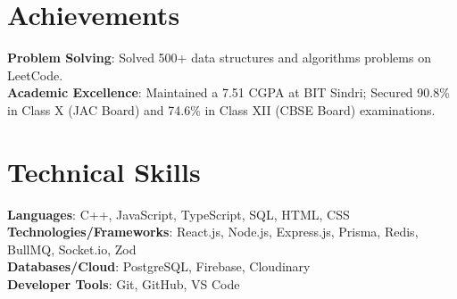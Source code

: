 \documentclass[letterpaper,11pt]{article}
\begin{document}
\section{Achievements}
 \begin{itemize}[leftmargin=0.15in, label={}]
    \small{\item{
     \textbf{Problem Solving}{: Solved 500+ data structures and algorithms problems on LeetCode.} \\
     \textbf{Academic Excellence}{: Maintained a 7.51 CGPA at BIT Sindri; Secured 90.8\% in Class X (JAC Board) and 74.6\% in Class XII (CBSE Board) examinations.}
    }}
 \end{itemize}
 \vspace{-16pt}

\section{Technical Skills}
 \begin{itemize}[leftmargin=0.15in, label={}]
    \small{\item{
     \textbf{Languages}{: C++, JavaScript, TypeScript, SQL, HTML, CSS} \\
     \textbf{Technologies/Frameworks}{: React.js, Node.js, Express.js, Prisma, Redis, BullMQ, Socket.io, Zod} \\
     \textbf{Databases/Cloud}{: PostgreSQL, Firebase, Cloudinary} \\
     \textbf{Developer Tools}{: Git, GitHub, VS Code} \\
    }}
 \end{itemize}
 \vspace{-16pt}
\end{document}
